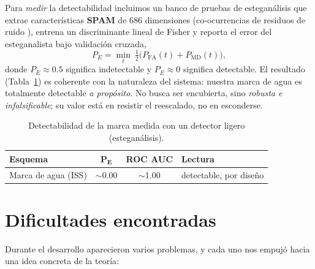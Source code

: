 \documentclass[12pt,a4paper]{article}
\renewcommand{\nobreakdash}{}
\begin{document}
Para \emph{medir} la detectabilidad incluimos un banco de pruebas de esteganálisis que
extrae características \textbf{SPAM} de $686$ dimensiones (co\nobreakdash-ocurrencias de
residuos de ruido \cite{fridrich2012srm}), entrena un discriminante lineal de Fisher y
reporta el error del esteganalista bajo validación cruzada,
\begin{equation}
P_E = \min_t\ \tfrac{1}{2}\big(P_{\mathrm{FA}}(t) + P_{\mathrm{MD}}(t)\big),
\end{equation}
donde $P_E\approx 0{.}5$ significa indetectable y $P_E\approx 0$ significa detectable. El
resultado (Tabla~\ref{tab:stegan}) es coherente con la naturaleza del sistema: nuestra marca
de agua es totalmente detectable \emph{a propósito}. No busca ser encubierta, sino
\emph{robusta e infalsificable}; su valor está en resistir el reescalado, no en esconderse.

\begin{table}[H]
\centering
\caption{Detectabilidad de la marca medida con un detector ligero (esteganálisis).}
\label{tab:stegan}
\begin{tabular}{@{}lccl@{}}
\toprule
\textbf{Esquema} & $\mathbf{P_E}$ & \textbf{ROC AUC} & \textbf{Lectura} \\
\midrule
Marca de agua (ISS) & $\sim$0.00 & $\sim$1.00 & detectable, por diseño \\
\bottomrule
\end{tabular}
\end{table}

\section{Dificultades encontradas}

Durante el desarrollo aparecieron varios problemas, y cada uno nos empujó hacia una idea
concreta de la teoría:
\end{document}
